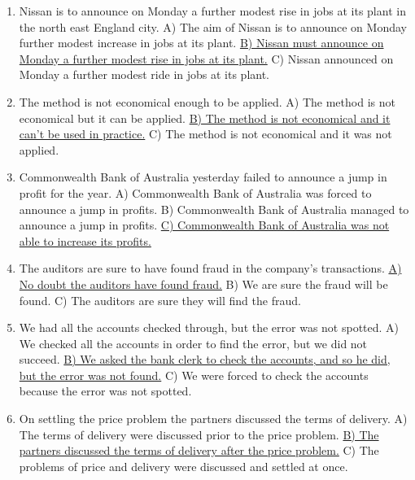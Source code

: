 \documentclass[main.tex]{subfiles}
\begin{document}
\begin{enumerate}[nosep, leftmargin=*]
	\item Nissan is to announce on Monday a further modest rise in jobs at its plant in the north east England city.\newline
		A) The aim of Nissan is to announce on Monday further modest increase in jobs at its plant.\newline
		\uline{B) Nissan must announce on Monday a further modest rise in jobs at its plant.}\newline
		C) Nissan announced on Monday a further modest ride in jobs at its plant.
	\item The method is not economical enough to be applied.\newline
		A) The method is not economical but it can be applied.\newline
		\uline{B) The method is not economical and it can't be used in practice.}\newline
		C) The method is not economical and it was not applied.
	\item Commonwealth Bank of Australia yesterday failed to announce a jump in profit for the year.\newline
		A) Commonwealth Bank of Australia was forced to announce a jump in profits.\newline
		B) Commonwealth Bank of Australia managed to announce a jump in profits.\newline
		\uline{C) Commonwealth Bank of Australia was not able to increase its profits.}
	\item The auditors are sure to have found fraud in the company's transactions.\newline
		\uline{A) No doubt the auditors have found fraud.}\newline
		B) We are sure the fraud will be found.\newline
		C) The auditors are sure they will find the fraud.
	\item We had all the accounts checked through, but the error was not spotted.\newline
		A) We checked all the accounts in order to find the error, but we did not succeed.\newline
		\uline{B) We asked the bank clerk to check the accounts, and so he did, but the error was not found.}\newline
		C) We were forced to check the accounts because the error was not spotted.
	\item On settling the price problem the partners discussed the terms of delivery.\newline
		A) The terms of delivery were discussed prior to the price problem.\newline
		\uline{B) The partners discussed the terms of delivery after the price problem.}\newline
		C) The problems of price and delivery were discussed and settled at once.
\end{enumerate}
\ 
\end{document}

